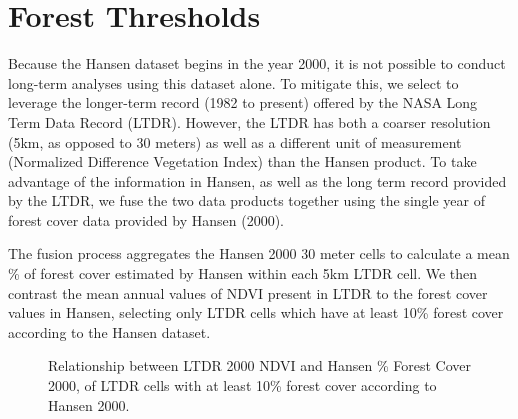 \documentclass{article}\usepackage[]{graphicx}\usepackage[]{color}
\newenvironment{knitrout}{}{}  %
\begin{document}
\begin{knitrout}
\section{Forest Thresholds}
Because the Hansen dataset begins in the year 2000, it is not possible to conduct long-term analyses using this dataset alone.  
To mitigate this, we select to leverage the longer-term record (1982 to present) offered by the NASA Long Term Data Record (LTDR).
However, the LTDR has both a coarser resolution (5km, as opposed to 30 meters) as well as a different unit of measurement (Normalized Difference Vegetation Index) than the Hansen product.
To take advantage of the information in Hansen, as well as the long term record provided by the LTDR, we fuse the two data products together using the single year of forest cover data provided by Hansen (2000).
\par
The fusion process aggregates the Hansen 2000 30 meter cells to calculate a mean \% of forest cover estimated by Hansen within each 5km LTDR cell.  
We then contrast the mean annual values of NDVI present in LTDR to the forest cover values in Hansen, selecting only LTDR cells which have at least 10\% forest cover according to the Hansen dataset. 
\begin{figure}[H]
\caption{Relationship between LTDR 2000 NDVI and Hansen \% Forest Cover 2000, of LTDR cells with at least 10\% forest cover according to Hansen 2000.}
\label{LTDR_Hansen}
\centering
\begin{Schunk}


\end{Schunk}
\end{figure}
\end{knitrout}
\end{document}
